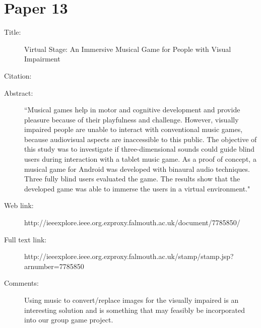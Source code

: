 \documentclass{scrartcl}
\begin{document}
\section*{Paper 13}
\begin{description}
\item[Title:] Virtual Stage: An Immersive Musical Game for People with Visual Impairment
\item[Citation:] \cite{Lotto}
\item[Abstract:] ``Musical games help in motor and cognitive development and provide pleasure because of their playfulness and challenge. However, visually impaired people are unable to interact with conventional music games, because audiovisual aspects are inaccessible to this public. The objective of this study was to investigate if three-dimensional sounds could guide blind users during interaction with a tablet music game. As a proof of concept, a musical game for Android was developed with binaural audio techniques. Three fully blind users evaluated the game. The results show that the developed game was able to immerse the users in a virtual environment."
\item[Web link:]http://ieeexplore.ieee.org.ezproxy.falmouth.ac.uk/document/7785850/
\item[Full text link:] http://ieeexplore.ieee.org.ezproxy.falmouth.ac.uk/stamp/stamp.jsp?arnumber=7785850
\item[Comments: ]Using music to convert/replace images for the visually impaired is an interesting solution and is something that may feasibly be incorporated into our group game project.
\end{description}
\end{document}
